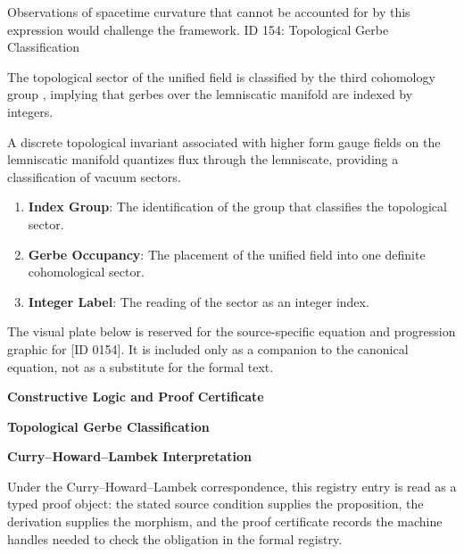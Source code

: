Observations of spacetime curvature that cannot be accounted for by this expression would challenge the framework. ID 154: Topological Gerbe Classification  

The topological sector of the unified field is classified by the third cohomology group , implying that gerbes over the lemniscatic manifold are indexed by integers.  

A discrete topological invariant associated with higher form gauge fields on the lemniscatic manifold quantizes flux through the lemniscate, providing a classification of vacuum sectors.
\endgroup

\begin{enumerate}[leftmargin=1.6em,itemsep=6pt,topsep=4pt]
\item \textbf{Index Group}: The identification of the group that classifies the topological sector.
\item \textbf{Gerbe Occupancy}: The placement of the unified field into one definite cohomological sector.
\item \textbf{Integer Label}: The reading of the sector as an integer index.
\end{enumerate}

\begingroup\footnotesize\sloppy
The visual plate below is reserved for the source-specific equation and progression graphic for [ID 0154]. It is included only as a companion to the canonical equation, not as a substitute for the formal text.
\par\endgroup
\ifTZPDarkEdition
{}
\fi

\clearpage
\begingroup\tzpsupportsetup
\noindent\textbf{\fontsize{10.8pt}{12.8pt}\selectfont [ID 0154] Constructive Logic and Proof Certificate}\par
\noindent\textbf{\fontsize{10pt}{12pt}\selectfont Topological Gerbe Classification}\par
\vspace{0.45em}
\begingroup
\footnotesize
\setlength{\parskip}{0.22em}
\setlength{\parindent}{0pt}
\noindent\textbf{Curry--Howard--Lambek Interpretation}\par
Under the Curry--Howard--Lambek correspondence, this registry entry is read as a typed proof
object: the stated source condition supplies the proposition, the derivation supplies the
morphism, and the proof certificate records the machine handles needed to check the obligation
in the formal registry.


